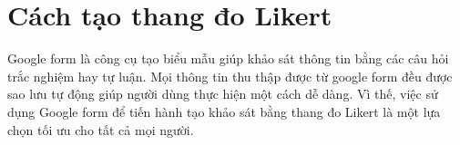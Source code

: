 \documentclass[12pt]{article}
\begin{document}
\section{Cách tạo thang đo Likert}
\phantom{}

Google form là công cụ tạo biểu mẫu giúp khảo sát thông tin bằng các câu hỏi trắc nghiệm hay tự luận. Mọi thông tin thu thập được từ google form đều được sao lưu tự động giúp người dùng thực hiện một cách dễ dàng. Vì thế, việc sử dụng Google form để tiến hành tạo khảo sát bằng thang đo Likert là một lựa chọn tối ưu cho tất cả mọi người. 
\end{document}
